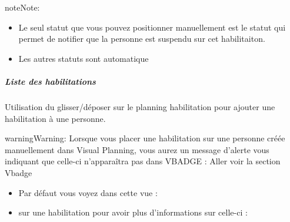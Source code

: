 \documentclass[letterpaper,10pt,english]{sphinxmanual}
\begin{document}
\begin{sphinxadmonition}{note}{Note:}\begin{itemize}
\item {} 
Le seul statut que vous pouvez positionner manuellement est le statut  qui permet  de notifier que la personne est suspendu sur cet habilitaiton.

\item {} 
Les autres statuts sont automatique

\end{itemize}
\end{sphinxadmonition}


\subparagraph{Liste des habilitations}
\label{\detokenize{fonctionnalitees/habilitation_formation:liste-des-habilitations}}\begin{quote}

\noindent{}
\end{quote}

Utilisation du glisser/déposer sur le planning habilitation pour ajouter une habilitation à une personne.

\begin{sphinxadmonition}{warning}{Warning:}
Lorsque vous placer une habilitation sur une personne créée manuellement dans Visual Planning, vous aurez un message
d’alerte vous indiquant que celle-ci n’apparaîtra pas dans VBADGE : Aller voir la section Vbadge
\end{sphinxadmonition}
\begin{itemize}
\item {} \begin{description}
\item[{Par défaut vous voyez dans cette vue :}] \leavevmode
{}

\end{description}

\item {} 
 sur une habilitation pour avoir plus d’informations sur celle-ci :
\begin{quote}

\noindent{}
\end{quote}

\end{itemize}
\end{document}
